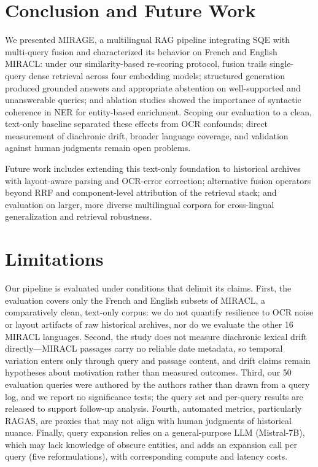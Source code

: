 \documentclass[11pt]{article}
\begin{document}
\section{Conclusion and Future Work}
\label{sec:conclusion}

We presented MIRAGE, a multilingual RAG pipeline integrating SQE with multi-query fusion and characterized its behavior on French and English MIRACL: under our similarity-based re-scoring protocol, fusion trails single-query dense retrieval across four embedding models; structured generation produced grounded answers and appropriate abstention on well-supported and unanswerable queries; and ablation studies showed the importance of syntactic coherence in NER for entity-based enrichment. Scoping our evaluation to a clean, text-only baseline separated these effects from OCR confounds; direct measurement of diachronic drift, broader language coverage, and validation against human judgments remain open problems.

Future work includes extending this text-only foundation to historical archives with layout-aware parsing and OCR-error correction; alternative fusion operators beyond RRF and component-level attribution of the retrieval stack; and evaluation on larger, more diverse multilingual corpora for cross-lingual generalization and retrieval robustness.

\section{Limitations}
\label{sec:limitations}
Our pipeline is evaluated under conditions that delimit its claims. First, the evaluation covers only the French and English subsets of MIRACL, a comparatively clean, text-only corpus: we do not quantify resilience to OCR noise or layout artifacts of raw historical archives, nor do we evaluate the other 16 MIRACL languages. Second, the study does not measure diachronic lexical drift directly---MIRACL passages carry no reliable date metadata, so temporal variation enters only through query and passage content, and drift claims remain hypotheses about motivation rather than measured outcomes. Third, our 50 evaluation queries were authored by the authors rather than drawn from a query log, and we report no significance tests; the query set and per-query results are released to support follow-up analysis. Fourth, automated metrics, particularly RAGAS, are proxies that may not align with human judgments of historical nuance. Finally, query expansion relies on a general-purpose LLM (Mistral-7B), which may lack knowledge of obscure entities, and adds an expansion call per query (five reformulations), with corresponding compute and latency costs.
\end{document}
